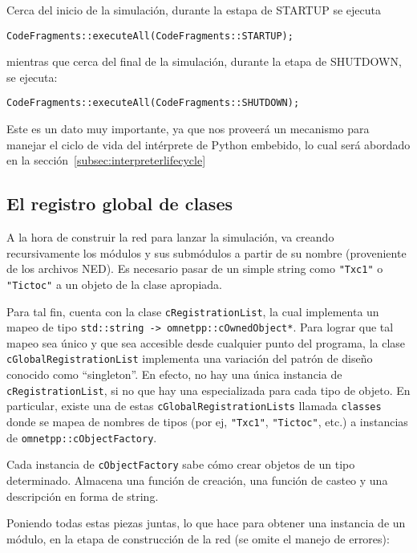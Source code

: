 Cerca del inicio de la simulación, durante la estapa de STARTUP se ejecuta

\begin{verbatim}
CodeFragments::executeAll(CodeFragments::STARTUP);
\end{verbatim}

mientras que cerca del final de la simulación, durante la etapa de SHUTDOWN, se ejecuta:

\begin{verbatim}
CodeFragments::executeAll(CodeFragments::SHUTDOWN);
\end{verbatim}

Este es un dato muy importante, ya que nos proveerá un mecanismo para manejar el ciclo de vida del intérprete de Python embebido,
lo cual será abordado en la sección~\ref{subsec:interpreterlifecycle}

\subsection{El registro global de clases}

A la hora de construir la red para lanzar la simulación, \omnetpp{} va creando
recursivamente los módulos y sus submódulos a partir de su nombre (proveniente
de los archivos NED). Es necesario pasar de un simple string como \verb!"Txc1"!
o \verb!"Tictoc"! a un objeto de la clase apropiada.

Para tal fin, \omnetpp{} cuenta con la clase \verb!cRegistrationList!, la cual
implementa un mapeo de tipo \verb!std::string -> omnetpp::cOwnedObject*!. Para
lograr que tal mapeo sea único y que sea accesible desde cualquier punto del
programa, la clase \verb!cGlobalRegistrationList! implementa una variación del
patrón de diseño conocido como ``singleton''. En efecto, no hay una única
instancia de \verb!cRegistrationList!, si no que hay una especializada para
cada tipo de objeto. En particular, existe una de estas
\verb!cGlobalRegistrationLists! llamada \verb!classes! donde se mapea de
nombres de tipos (por ej, \verb!"Txc1"!, \verb!"Tictoc"!, etc.) a instancias de
\verb!omnetpp::cObjectFactory!.

Cada instancia de \verb!cObjectFactory! sabe cómo crear objetos de un tipo
determinado. Almacena una función de creación, una función de casteo y una
descripción en forma de string.

Poniendo todas estas piezas juntas, lo que \omnetpp{} hace para obtener una
instancia de un módulo, en la etapa de construcción de la red (se omite el
manejo de errores):

